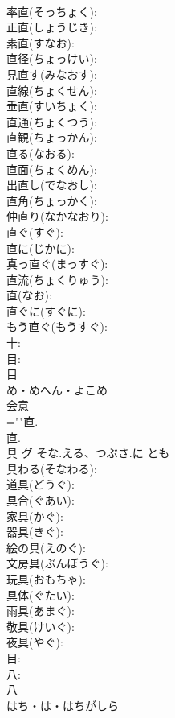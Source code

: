 \documentclass[8pt]{extreport}
\begin{document}
\begin{CJK}{UTF8}{min}
\\	率直(そっちょく): 
\\	正直(しょうじき): 
\\	素直(すなお): 
\\	直径(ちょっけい): 
\\	見直す(みなおす): 
\\	直線(ちょくせん): 
\\	垂直(すいちょく): 
\\	直通(ちょくつう): 
\\	直観(ちょっかん): 
\\	直る(なおる): 
\\	直面(ちょくめん): 
\\	出直し(でなおし): 
\\	直角(ちょっかく): 
\\	仲直り(なかなおり): 
\\	直ぐ(すぐ): 
\\	直に(じかに): 
\\	真っ直ぐ(まっすぐ): 
\\	直流(ちょくりゅう): 
\\	直(なお): 
\\	直ぐに(すぐに): 
\\	もう直ぐ(もうすぐ): 
\\	十: 
\\	目: 
\\	目	
\\	め・めへん・よこめ	
\\	会意 
\\	=""直.
\\	直.
\\	具	グ	そな.える、つぶさ.に	とも	
\\	具わる(そなわる): 
\\	道具(どうぐ): 
\\	具合(ぐあい): 
\\	家具(かぐ): 
\\	器具(きぐ): 
\\	絵の具(えのぐ): 
\\	文房具(ぶんぼうぐ): 
\\	玩具(おもちゃ): 
\\	具体(ぐたい): 
\\	雨具(あまぐ): 
\\	敬具(けいぐ): 
\\	夜具(やぐ): 
\\	目: 
\\	八: 
\\	八	
\\	はち・は・はちがしら	

\end{CJK}
\end{document}
